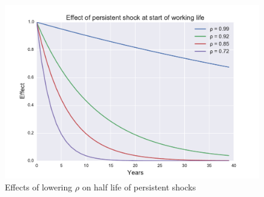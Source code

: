 \begin{figure}
\includegraphics[width=\columnwidth]{effect_rho}
\caption{Effects of lowering $\rho$ on half life of persistent shocks}
\label{fig:effect_rho}
\end{figure}